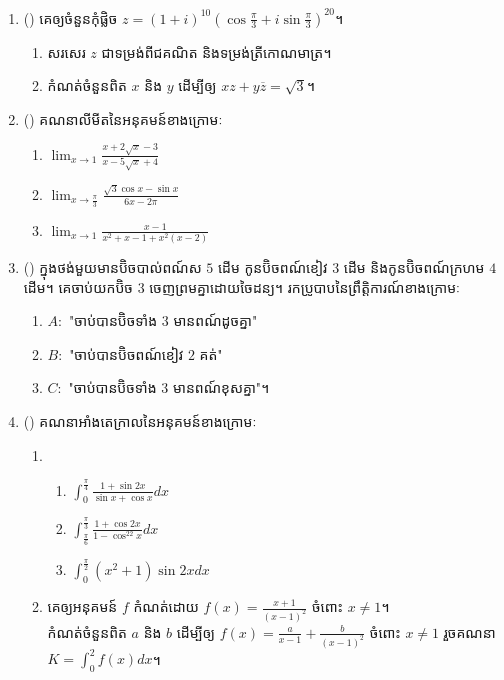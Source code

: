 \documentclass{officialexam}
\begin{document}
\begin{enumerate}[I]
	\item {\color{khtug}()} គេឲ្យចំនួនកុំផ្លិច $z=\left(1+i\right)^{10}\left(\cos\frac{\pi}{3}+i\sin\frac{\pi}{3}\right)^{20}$។
	\begin{enumerate}[k,2]
		\item សរសេរ $z$ ជាទម្រង់ពីជគណិត និងទម្រង់ត្រីកោណមាត្រ។
		\item កំណត់ចំនួនពិត $x$ និង $y$ ដើម្បីឲ្យ $xz+y\overline{z}=\sqrt{3}$។
	\end{enumerate}
	\item {\color{khtug}()} គណនាលីមីតនៃអនុគមន៍ខាងក្រោមៈ
	\begin{enumerate}[k,3]
		\item $\lim_{x\to1}\frac{x+2\sqrt{x}-3}{x-5\sqrt{x}+4}$
		\item $\lim_{x\to\frac{\pi}{3}}\frac{\sqrt{3}\cos x -\sin x}{6x-2\pi}$
		\item $\lim_{x\to1}\frac{x-1}{x^2+x-1+x^2\left(x-2\right)}$
	\end{enumerate}
	\item {\color{khtug}()} ក្នុងថង់មួយមានប៊ិចបាល់ពណ៍ស $5$ ដើម កូនប៊ិចពណ៍ខៀវ $3$ ដើម និងកូនប៊ិចពណ៍ក្រហម $4$ ដើម។ គេចាប់យកប៊ិច $3$ ចេញព្រមគ្នាដោយចៃដន្យ។ រកប្រូបាបនៃព្រឹត្តិការណ៍ខាងក្រោមៈ
	\begin{enumerate}[k,2]
		\item $A:$ "ចាប់បានប៊ិចទាំង $3$ មានពណ៍ដូចគ្នា"
		\item $B:$ "ចាប់បានប៊ិចពណ៍ខៀវ $2$ គត់"
		\item $C:$ "ចាប់បានប៊ិចទាំង $3$ មានពណ៍ខុសគ្នា"។
	\end{enumerate}
	\item {\color{khtug}()} គណនាអាំងតេក្រាលនៃអនុគមន៍ខាងក្រោមៈ
	\begin{enumerate}[m]
		\item \begin{enumerate}[k,3]
			\item $\int_{0}^{\frac{\pi}{4}}\frac{1+\sin2x}{\sin x + \cos x}dx$
			\item $\int_{\frac{\pi}{6}}^{\frac{\pi}{3}}\frac{1+\cos2x}{1-\cos^22x}dx$
			\item $\int_{0}^{\frac{\pi}{2}}\left(x^2+1\right)\sin2xdx$
		\end{enumerate}
		\item គេឲ្យអនុគមន៍ $f$ កំណត់ដោយ $f(x)=\frac{x+1}{\left(x-1\right)^2}$ ចំពោះ $x\ne 1$។\\ កំណត់ចំនួនពិត $a$ និង $b$ ដើម្បីឲ្យ $f(x)=\frac{a}{x-1}+\frac{b}{\left(x-1\right)^2}$ ចំពោះ $x\ne 1$ រួចគណនា $K=\int_{0}^{2}f(x)dx$។

\end{enumerate}
\end{enumerate}
\end{document}
